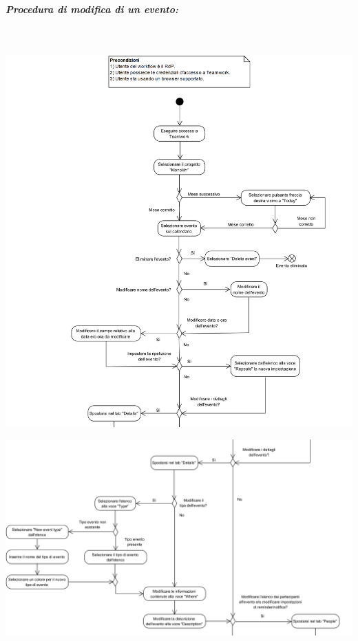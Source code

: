 \begin{samepage}
	\subparagraph{Procedura di modifica di un evento:}\mbox{}\\
	
	\begin{center}
		\includegraphics[width=15cm]{../../documenti/NormeDiProgetto/DiagrammiProcedure/EditEventi1.png}
	\end{center}
	
\end{samepage}

\begin{center}
	\includegraphics[width=15cm]{../../documenti/NormeDiProgetto/DiagrammiProcedure/EditEventi2.png}
\end{center}

